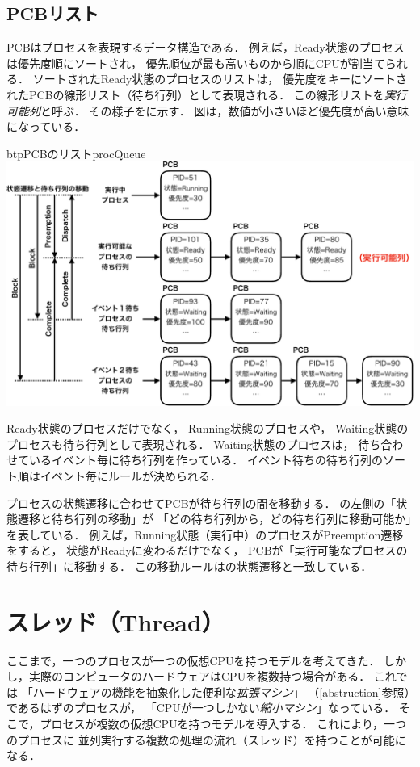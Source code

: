\subsection{PCBリスト}
PCBはプロセスを表現するデータ構造である．
例えば，Ready状態のプロセスは優先度順にソートされ，
優先順位が最も高いものから順にCPUが割当てられる．
ソートされたReady状態のプロセスのリストは，
優先度をキーにソートされたPCBの線形リスト（待ち行列）として表現される．
この線形リストを\emph{実行可能列}と呼ぶ．
その様子をに示す．
図は，数値が小さいほど優先度が高い意味になっている．

\begin{myfig}{btp}{PCBのリスト}{procQueue}
  \includegraphics[scale=0.55]{Fig/procQueue-crop.pdf}
\end{myfig}

Ready状態のプロセスだけでなく，
Running状態のプロセスや，
Waiting状態のプロセスも待ち行列として表現される．
Waiting状態のプロセスは，
待ち合わせているイベント毎に待ち行列を作っている．
イベント待ちの待ち行列のソート順はイベント毎にルールが決められる．

プロセスの状態遷移に合わせてPCBが待ち行列の間を移動する．
の左側の「状態遷移と待ち行列の移動」が
「どの待ち行列から，どの待ち行列に移動可能か」を表している．
例えば，Running状態（実行中）のプロセスがPreemption遷移をすると，
状態がReadyに変わるだけでなく，
PCBが「実行可能なプロセスの待ち行列」に移動する．
この移動ルールはの状態遷移と一致している．

\section{スレッド（Thread）}
ここまで，一つのプロセスが一つの仮想CPUを持つモデルを考えてきた．
しかし，実際のコンピュータのハードウェアはCPUを複数持つ場合がある．
これでは
「ハードウェアの機能を抽象化した便利な\emph{拡張マシン}」
（\ref{abstruction}参照）であるはずのプロセスが，
「CPUが一つしかない\emph{縮小マシン}」なっている．
そこで，プロセスが複数の仮想CPUを持つモデルを導入する．
これにより，一つのプロセスに
並列実行する複数の処理の流れ（スレッド）を持つことが可能になる．

